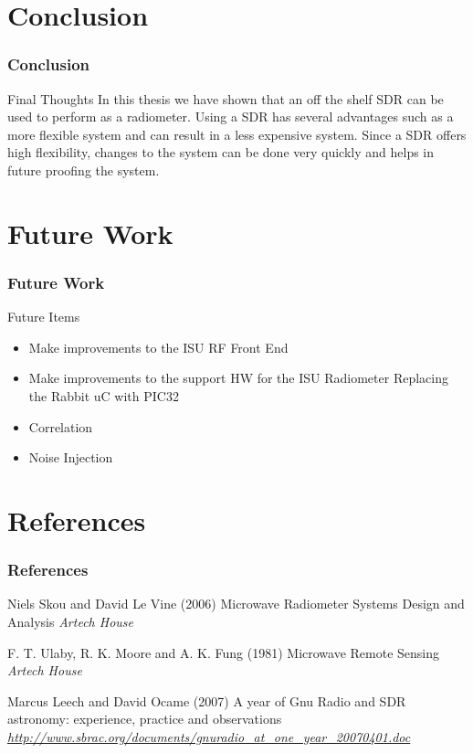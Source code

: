 \documentclass{beamer}
\begin{document}
\section{Conclusion}
\begin{frame}
\frametitle{Conclusion}
\begin{block}{Final Thoughts}
In this thesis we have shown that an off the shelf SDR can be used to perform as a radiometer.  Using a SDR has several advantages such as a more flexible system and can result in a less expensive system.  Since a SDR offers high flexibility, changes to the system can be done very quickly and helps in future proofing the system.  
\end{block}
\end{frame}
\section{Future Work}
\begin{frame}
\frametitle{Future Work}
\begin{block}{Future Items}
\begin{itemize}
\item Make improvements to the ISU RF Front End
\item Make improvements to the support HW for the ISU Radiometer
\note Replacing the Rabbit uC with PIC32
\item Correlation
\item Noise Injection
\end{itemize}
\end{block}
\end{frame}

\section{References}
\begin{frame}
\frametitle{References}
\footnotesize{
\begin{thebibliography}{99}
 Niels Skou and David Le Vine (2006)
\newblock Microwave Radiometer Systems Design and Analysis
\newblock \emph{Artech House}

 F. T. Ulaby, R. K. Moore and A. K. Fung (1981)
\newblock Microwave Remote Sensing
\newblock \emph{Artech House}

 Marcus Leech and David Ocame (2007)
\newblock A year of Gnu Radio and SDR astronomy: experience, practice and observations
\newblock \emph{\url{http://www.sbrac.org/documents/gnuradio_at_one_year_20070401.doc}}

\end{thebibliography}
}
\end{frame}
\end{document}
